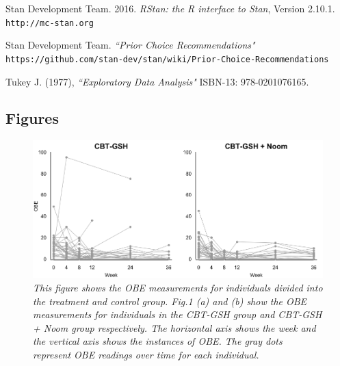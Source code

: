 \documentclass{article}
\begin{document}
\begin{thebibliography}{9}
Stan Development Team. 2016. 
\textit{RStan: the R interface to Stan}, Version 2.10.1.   
\texttt{http://mc-stan.org}

Stan Development Team.
\textit{``Prior Choice Recommendations"}
\texttt{https://github.com/stan-dev/stan/wiki/Prior-Choice-Recommendations}

Tukey J. (1977),
\textit{``Exploratory Data Analysis"}
ISBN-13: 978-0201076165.





\end{thebibliography}
\fi
\newpage 



\subsection*{Figures}
\begin{figure}[H]
   \begin{center}
\includegraphics[width=\textwidth, height=\textheight, keepaspectratio]{Noom_paths.png}
   \end{center}
\caption{\emph{This figure shows the OBE measurements for individuals divided into the treatment and control group. Fig.1 (a) and (b) show the OBE measurements for individuals in the CBT-GSH group and CBT-GSH + Noom group respectively. The horizontal axis shows the week and the vertical axis shows the instances of OBE. The gray dots represent OBE readings over time for each individual. }}
\end{figure}
\end{document}
